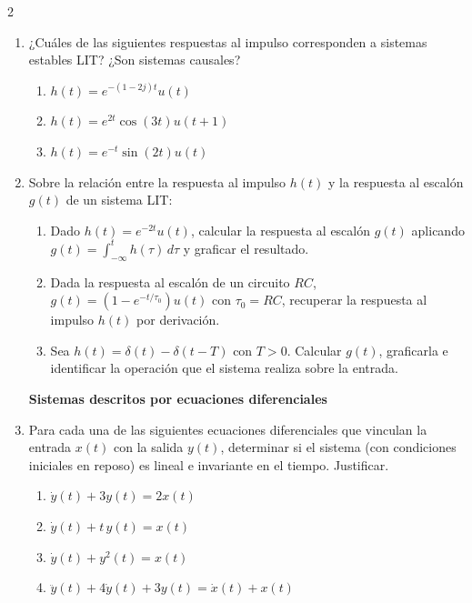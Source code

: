 \documentclass[10pt,a4paper]{article}
\begin{document}
\begin{multicols}{2}
\begin{enumerate}
			\textbf{Propiedades de los sistemas LIT}
			\item ¿Cuáles de las siguientes respuestas al impulso corresponden a sistemas estables LIT? ¿Son sistemas causales?
			\begin{enumerate}
				\item $h(t)=e^{-(1-2j)t}u(t)$
				\item $h(t)=e^{2t}\cos(3t)u(t+1)$
				\item $h(t)=e^{-t}\sin(2t)u(t)$
			\end{enumerate}

			\item Sobre la relación entre la respuesta al impulso $h(t)$ y la respuesta al escalón $g(t)$ de un sistema LIT:
			\begin{enumerate}
				\item Dado $h(t)=e^{-2t}u(t)$, calcular la respuesta al escalón $g(t)$ aplicando $g(t)=\int_{-\infty}^{t}h(\tau)\,d\tau$ y graficar el resultado.
				\item Dada la respuesta al escalón de un circuito $RC$, $g(t)=(1-e^{-t/\tau_0})u(t)$ con $\tau_0=RC$, recuperar la respuesta al impulso $h(t)$ por derivación.
				\item Sea $h(t)=\delta(t)-\delta(t-T)$ con $T>0$. Calcular $g(t)$, graficarla e identificar la operación que el sistema realiza sobre la entrada.
			\end{enumerate}

			\textbf{Sistemas descritos por ecuaciones diferenciales}
			\item Para cada una de las siguientes ecuaciones diferenciales que vinculan la entrada $x(t)$ con la salida $y(t)$, determinar si el sistema (con condiciones iniciales en reposo) es lineal e invariante en el tiempo. Justificar.
			\begin{enumerate}
				\item $\dot{y}(t)+3y(t)=2x(t)$
				\item $\dot{y}(t)+t\,y(t)=x(t)$
				\item $\dot{y}(t)+y^2(t)=x(t)$
				\item $\ddot{y}(t)+4\dot{y}(t)+3y(t)=\dot{x}(t)+x(t)$
			\end{enumerate}


\end{enumerate}
\end{multicols}
\end{document}
